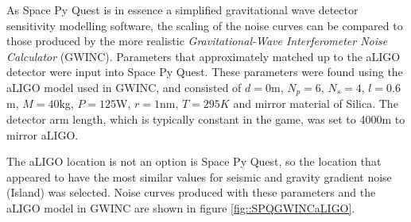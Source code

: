 \documentclass{article}
\begin{document}
As Space Py Quest is in essence a simplified gravitational wave
detector sensitivity modelling software, the scaling of the noise
curves can be compared to those produced by the more realistic
\textit{Gravitational-Wave Interferometer Noise Calculator}
(GWINC)\cite{GWINC}. Parameters that approximately matched up to the
aLIGO detector were input into Space Py Quest. These parameters were
found using the aLIGO model used in GWINC, and consisted of $d=0$m,
$N_p=6$, $N_s=4$, $l=0.6$m, $M =40$kg, $P=125$W, $r=1$nm, $T=295K$ and
mirror material of Silica. The detector arm length, which is typically
constant in the game, was set to 4000m to mirror aLIGO. 

The aLIGO location is not an option is Space Py Quest, so the location
that appeared to have the most similar values for seismic and gravity
gradient noise (Island) was selected. Noise curves produced with these
parameters and the aLIGO model in GWINC are shown in figure
\ref{fig::SPQGWINCaLIGO}. 
\end{document}
